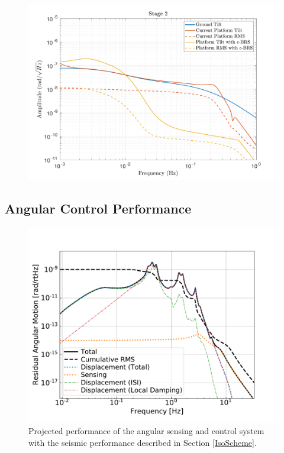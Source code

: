 \documentclass [12pt, proquest]{uwthesis}[2019]
\begin{document}
\begin{figure}%
\begin{center}
\includegraphics[width=\textwidth]{cBRS_Model_CompRX.pdf}
\caption{}
\label{cBRSCompX}
\end{center}
\end{figure}

\subsection{Angular Control Performance}

\begin{figure}
\begin{center}
\includegraphics[width=\textwidth]{cBRS_ASC_With.pdf}
\caption{Projected performance of the angular sensing and control system with the seismic performance described in Section \ref{IsoScheme}.}
\label{ascWith}
\end{center}
\end{figure}
\end{document}
